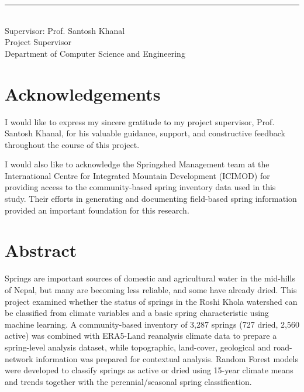 \documentclass[12pt,a4paper]{article}
\begin{document}
\vspace{2.5cm}
\noindent\rule{6cm}{0.4pt}\\
Supervisor: Prof. Santosh Khanal\\
Project Supervisor\\
Department of Computer Science and Engineering
\clearpage
\clearpage
\section*{Acknowledgements}

I would like to express my sincere gratitude to my project supervisor, Prof. Santosh Khanal, for his valuable guidance, support, and constructive feedback throughout the course of this project.

I would also like to acknowledge the Springshed Management team at the International Centre for Integrated Mountain Development (ICIMOD) for providing access to the community-based spring inventory data used in this study. Their efforts in generating and documenting field-based spring information provided an important foundation for this research.

\clearpage
\section*{Abstract}

Springs are important sources of domestic and agricultural water in the mid-hills of Nepal, but many are becoming less reliable, and some have already dried. This project examined whether the status of springs in the Roshi Khola watershed can be classified from climate variables and a basic spring characteristic using machine learning. A community-based inventory of 3,287 springs (727 dried, 2,560 active) was combined with ERA5-Land reanalysis climate data to prepare a spring-level analysis dataset, while topographic, land-cover, geological and road-network information was prepared for contextual analysis. Random Forest models were developed to classify springs as active or dried using 15-year climate means and trends together with the perennial/seasonal spring classification.
\end{document}
